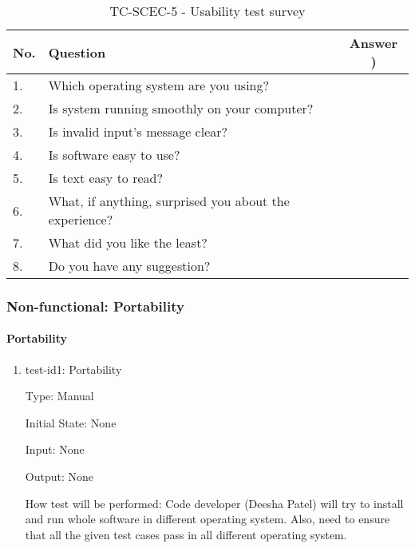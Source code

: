 \documentclass[12pt, titlepage]{article}
\begin{document}
\begin{table}[h!]
\begin{center}
\begin{tabular}{ p{0.5cm}|p{10cm}|c }
\hline
No. &  Question   & Answer ) \\
\hline
1. & Which operating system are you using?  & \\
2. & Is system running smoothly on your computer?  & \\
3. & Is invalid input's message clear?  &  \\
4. & Is software easy to use? & \\
5. & Is text easy to read? & \\
6. & What, if anything, surprised you about the experience? & \\
7. & What did you like the least? & \\
8. & Do you have any suggestion?  & \\

\hline
\end{tabular}
\caption{TC-SCEC-5 - Usability test survey}
\label{tab:tc-SCEC-5}
\end{center}
\end{table}

\subsubsection{Non-functional: Portability}
\label{non_functional_portability}		
\paragraph{Portability}

\begin{enumerate}
					
\item{test-id1: Portability\\}

Type: Manual
					
Initial State: None 
					
Input: None 
					
Output: None
					
How test will be performed: Code developer (Deesha Patel) will try to install and run whole software in different operating system. Also, need to ensure that all the given test cases pass in all different operating system.  

\end{enumerate}
\end{document}
